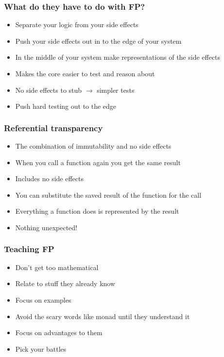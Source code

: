 \documentclass{beamer}
\begin{document}
\begin{frame}
  \frametitle{What do they have to do with FP?}
  \begin{itemize}
    \item Separate your logic from your side effects
    \item Push your side effects out in to the edge of your system
    \item In the middle of your system make representations of the side effects
    \item Makes the core easier to test and reason about
    \item No side effects to stub $\rightarrow$ simpler tests
    \item Push hard testing out to the edge
  \end{itemize}
\end{frame}

\begin{frame}
  \frametitle{Referential transparency}
  \begin{itemize}
    \item The combination of immutability and no side effects
    \item When you call a function again you get the same result
    \item Includes no side effects
    \item You can substitute the saved result of the function for the call
    \item Everything a function does is represented by the result
    \item Nothing unexpected!
  \end{itemize}
\end{frame}

\begin{frame}
  \frametitle{Teaching FP}
  \begin{itemize}
    \item Don't get too mathematical
    \item Relate to stuff they already know
    \item Focus on examples
    \item Avoid the scary words like monad until they understand it
    \item Focus on advantages to them
    \item Pick your battles
  \end{itemize}
\end{frame}
\end{document}
